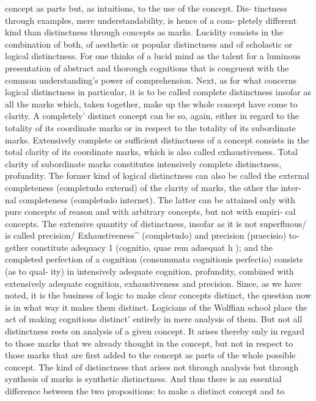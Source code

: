 concept as parts but, as intuitions, to the use of the concept. Dis-
tinctness through examples, mere understandability, is hence of a com-
pletely different kind than distinctness through concepts as marks.
Lucidity consists in the combination of both, of aesthetic or popular
distinctness and of scholastic or logical distinctness. For one thinks of a
lucid mind as the talent for a luminous presentation of abstract and
thorough cognitions that is congruent with the common understanding's
power of comprehension.
Next, as for what concerns logical distinctness in particular, it is to be
called complete distinctness insofar as all the marks which, taken together,
make up the whole concept have come to clarity. A completely' distinct
concept can be so, again, either in regard to the totality of its coordinate
marks or in respect to the totality of its subordinate marks. Extensively
complete or sufficient distinctness of a concept consists in the total clarity
of its coordinate marks, which is also called exhaustiveness. Total clarity of
subordinate marks constitutes intensively complete distinctness, profundity.
The former kind of logical distinctness can also be called the external
completeness (completudo externd) of the clarity of marks, the other the inter-
nal completeness (completudo internet). The latter can be attained only with
pure concepts of reason and with arbitrary concepts, but not with empiri-
cal concepts.
The extensive quantity of distinctness, insofar as it is not superfluous/ is
called precision/ Exhaustiveness^ (completudo) and precision (praecisio) to-
gether constitute adequacy 1 (cognitio, quae rem adaequat h ); and the completed
perfection of a cognition (consummata cognitionis perfectio) consists (as to qual-
ity) in intensively adequate cognition, profundity, combined with extensively
adequate cognition, exhaustiveness and precision.
Since, as we have noted, it is the business of logic to make clear concepts
distinct, the question now is in what way it makes them distinct.
Logicians of the Wolffian school place the act of making cognitions
distinct' entirely in mere analysis of them. But not all distinctness rests on
analysis of a given concept. It arises thereby only in regard to those marks
that we already thought in the concept, but not in respect to those marks
that are first added to the concept as parts of the whole possible concept.
The kind of distinctness that arises not through analysis but through
synthesis of marks is synthetic distinctness. And thus there is an essential
difference between the two propositions: to make a distinct concept and to
